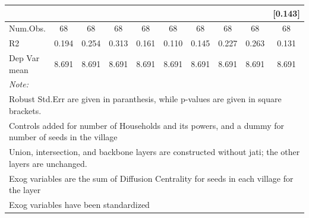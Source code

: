 \begin{table}
\begin{tabular}[t]{lccccccccc}
 &  &  &  &  &  &  &  &  & {}[\num{0.143}]\\
\midrule
Num.Obs. & \num{68} & \num{68} & \num{68} & \num{68} & \num{68} & \num{68} & \num{68} & \num{68} & \num{68}\\
R2 & \num{0.194} & \num{0.254} & \num{0.313} & \num{0.161} & \num{0.110} & \num{0.145} & \num{0.227} & \num{0.263} & \num{0.131}\\
Dep Var mean & \num{8.691} & \num{8.691} & \num{8.691} & \num{8.691} & \num{8.691} & \num{8.691} & \num{8.691} & \num{8.691} & \num{8.691}\\
\bottomrule
\multicolumn{10}{l}{\rule{0pt}{1em}\textit{Note: }}\\
\multicolumn{10}{l}{\rule{0pt}{1em}Robust Std.Err are given in paranthesis, while p-values are given in square brackets.}\\
\multicolumn{10}{l}{\rule{0pt}{1em}Controls added for number of Households and its powers, and a dummy for number of seeds in the village}\\
\multicolumn{10}{l}{\rule{0pt}{1em}Union, intersection, and backbone layers are constructed without jati; the other layers are unchanged.}\\
\multicolumn{10}{l}{\rule{0pt}{1em}Exog variables are the sum of Diffusion Centrality for seeds in each village for the layer}\\
\multicolumn{10}{l}{\rule{0pt}{1em}Exog variables have been standardized}\\
\end{tabular}
\end{table}
